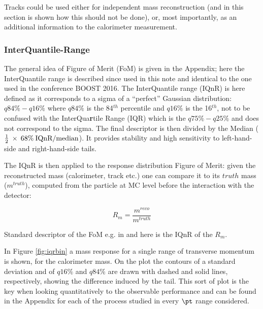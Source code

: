 Tracks could be used either for independent mass reconstruction (and in this section is shown how this should not be done), or, most importantly, as an additional information to the calorimeter measurement.

\subsubsection{InterQuantile-Range}
The general idea of Figure of Merit (FoM) is given in the Appendix; here the InterQuantile range is described since used in this note and identical to the one used in the conference BOOST 2016.
The InterQuantile range (IQnR) is here defined as it corresponds to a sigma of a ``perfect'' Gaussian distribution: $q84\%-q16\%$ where $q84\%$ is the 84$^{th}$ percentile and $q16\%$ is the 16$^{th}$, not to be confused with the InterQua\textbf{r}tile Range (IQR) which is the $q75\%-q25\%$ and does not correspond to the sigma. The final descriptor is then divided by the Median ($\frac{1}{2}\: \times\: 68\% \:\textrm{IQnR/median}$). It provides stability and high sensitivity to left-hand-side and right-hand-side tails.

The IQnR is then applied to the response distribution Figure of Merit: given the reconstructed mass (calorimeter, track etc.) one can compare it to its $truth$ mass ($m^{truth}$), computed from the particle at MC level before the interaction with the detector:

$$R_m=\frac{m^{reco}}{m^{truth}}$$

Standard descriptor of the FoM e.g. in \cite{art35} and here is the IQnR of the $R_m$.
  
  
In Figure \ref{fig:iqrbin} a mass response for a single range of transverse momentum is shown, for the calorimeter mass. On the plot the contours of a standard deviation and of $q16\%$ and $q84\%$ are drawn with dashed and solid lines, respectively, showing the difference induced by the tail. This sort of plot is the key when looking quantitatively to the observable performance and can be found in the Appendix for each of the process studied in every $\pt$ range considered. 

